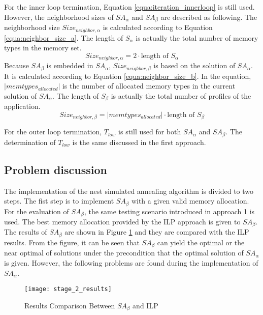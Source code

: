 		For the inner loop termination, Equation \ref{equa:iteration_innerloop} is still used.
		However, the neighborhood sizes of $SA_{\alpha}$ and $SA_{\beta}$
		are described as following.
		The neighborhood size $Size_{neighbor,\alpha}$ is calculated according
		to Equation \ref{equa:neighbor_size_a}.
		The length of $S_{\alpha}$ is actually the total number of memory types
		in the memory set.
		\begin{equation}
		\label{equa:neighbor_size_a}
			Size_{neighbor,\alpha}=2 \cdot \text{length of } S_{\alpha} 
		\end{equation}
		Because $SA_{\beta}$ is embedded in $SA_{\alpha}$, $Size_{neighbor,\beta}$ is
		based on the solution of $SA_{\alpha}$.
		It is calculated according to Equation \ref{equa:neighbor_size_b}.
		In the equation, $\lvert memtypes_{allocated} \rvert$ is the number of
		allocated memory types in the current solution of $SA_{\alpha}$.
		The length of $S_{\beta}$ is actually the total number of profiles of the application.
		\begin{equation}
		\label{equa:neighbor_size_b}
			Size_{neighbor,\beta}=\lvert memtypes_{allocated} \rvert \cdot \text{length of } S_{\beta} 
		\end{equation}
		
		For the outer loop termination, $T_{low}$ is still used for both
		$SA_{\alpha}$ and $SA_{\beta}$.
		The determination of $T_{low}$ is the same discussed in the first approach.
	
		\subsection{Problem discussion}
		\label{subsec:problem_2}
		The implementation of the nest simulated annealing algorithm is divided to two steps.
		The fist step is to implement $SA_{\beta}$ with a given valid memory allocation.
		For the evaluation of $SA_{\beta}$, the same testing scenario introduced in approach 1
		is used. The best memory allocation provided by the ILP approach is given to $SA_{\beta}$.
		The results of $SA_{\beta}$ are shown in
		Figure \ref{fig:stage_2_results} and they are compared with the ILP results.
		From the figure, it can be seen that $SA_{\beta}$ can yield the optimal or the
		near optimal of solutions under the precondition that the optimal solution of
		$SA_{\alpha}$ is given.
		However, the following problems are found during the implementation of $SA_{\alpha}$.
		\begin{figure}[htb]
			\begin{center}
				\texttt{[image: stage\_2\_results]}
				\caption{Results Comparison Between $SA_{\beta}$ and ILP}
				\label{fig:stage_2_results}
			\end{center}
		\end{figure}		
		
